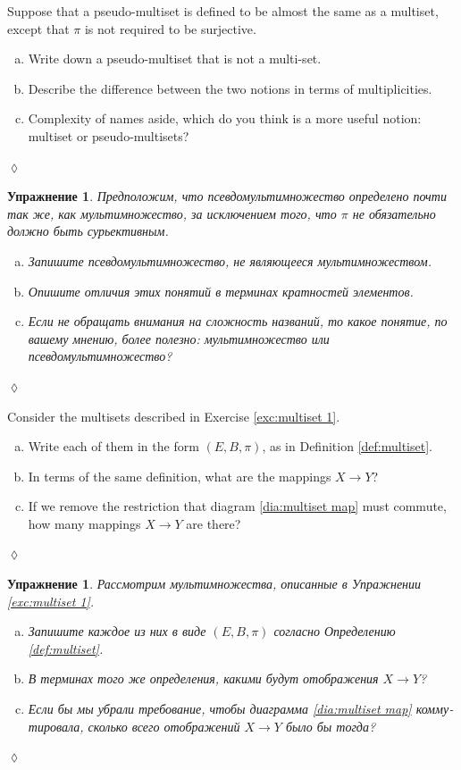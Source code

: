 \documentclass[a4paper]{book}
\def\to{\rightarrow}
\theoremstyle{myth}
\newtheorem{excENG}[envENG]{\begin{english}Exercise\end{english}}
\newenvironment{exerciseENG}{\begin{excENG}}{\hspace*{\fill}$\lozenge$\end{excENG}}
\newtheorem{excRUS}[envRUS]{Упражнение}
\newenvironment{exerciseRUS}{\begin{excRUS}}{\hspace*{\fill}$\lozenge$\end{excRUS}}
\def\sexc{\begin{enumerate}[a.)]\setlength{\itemsep}{.1cm}\setlength{\parskip}{.1cm}\item}
\def\next{\item}
\def\endsexc{\end{enumerate}}
\begin{document}
\begin{russian}
\begin{exerciseENG}
Suppose that a pseudo-multiset is defined to be almost the same as a multiset, except that $\pi$ is not required to be surjective. 
\sexc Write down a pseudo-multiset that is not a multi-set. 
\next Describe the difference between the two notions in terms of multiplicities. 
\next Complexity of names aside, which do you think is a more useful notion: multiset or pseudo-multisets? 
\endsexc
\end{exerciseENG}

\begin{exerciseRUS}
Предположим, что {\em псевдомультимножество} определено почти так же, как мультимножество, за исключением того, что $\pi$ не обязательно должно быть сурьективным. 
\sexc Запишите псевдомультимножество, не являющееся мультимножеством. 
\next Опишите отличия этих понятий в терминах кратностей элементов. 
\next Если не обращать внимания на сложность названий, то какое понятие, по вашему мнению, более полезно: мультимножество или псевдомультимножество? 
\endsexc
\end{exerciseRUS}

\begin{exerciseENG}
Consider the multisets described in Exercise \ref{exc:multiset 1}. 
\sexc Write each of them in the form $(E,B,\pi)$, as in Definition \ref{def:multiset}. 
\next In terms of the same definition, what are the mappings $X\to Y$? 
\next If we remove the restriction that diagram \ref{dia:multiset map} must commute, how many mappings $X\to Y$ are there?
\endsexc
\end{exerciseENG}

\begin{exerciseRUS}
Рассмотрим мультимножества, описанные в Упражнении \ref{exc:multiset 1}. 
\sexc Запишите каждое из них в виде $(E,B,\pi)$ согласно Определению \ref{def:multiset}. 
\next В терминах того же определения, какими будут отображения $X\to Y$? 
\next Если бы мы убрали требование, чтобы диаграмма \ref{dia:multiset map} коммутировала, сколько всего отображений $X\to Y$ было бы тогда?
\endsexc
\end{exerciseRUS}


\end{russian}
\end{document}
